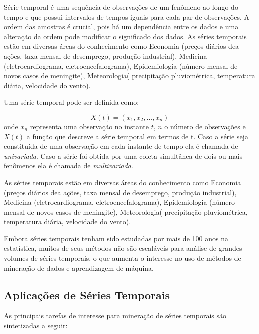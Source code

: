 Série temporal é uma sequência de observações de um fenômeno ao longo do tempo e que possui intervalos de tempos iguais para cada par de observações.  A ordem das amostras é crucial, pois há um dependência entre os dados e uma alteração da ordem pode modificar o significado dos dados. As séries temporais estão em diversas áreas do conhecimento como Economia (preços diários dea ações, taxa mensal de desemprego, produção industrial), Medicina (eletrocardiograma, eletroencefalograma), Epidemiologia (número mensal de novos casos de meningite), Meteorologia( precipitação pluviométrica, temperatura diária, velocidade do vento).  

Uma série temporal pode ser definida como:

\begin{equation} \label{eq_TS}
X(t) = (x_1,x_2,...,x_n)
\end{equation}
onde $x_n$ representa uma observação no instante $t$, $n$ o número de observações e $X(t)$ a função que descreve a série temporal em termos de t. Caso a série seja constituída de uma observação em cada instante de tempo ela é chamada de \textit{univariada}. Caso a série foi obtida por uma coleta simultânea de dois ou mais fenômenos ela é chamada de \textit{multivariada}.

As séries temporais estão em diversas áreas do conhecimento como Economia (preços diários dea ações, taxa mensal de desemprego, produção industrial), Medicina (eletrocardiograma, eletroencefalograma), Epidemiologia (número mensal de novos casos de meningite), Meteorologia( precipitação pluviométrica, temperatura diária, velocidade do vento).

Embora séries temporais tenham sido estudadas por mais de 100 anos na estatística, muitos de seus métodos não são escaláveis para análise de grandes volumes de séries temporais, o que aumenta o interesse no uso de métodos de mineração de dados e aprendizagem de máquina. \cite{Maimon:2005:DMK:1088958}
\subsection{Aplicações de Séries Temporais}
As principais tarefas de interesse para mineração de séries temporais são sintetizadas a seguir\cite{Maimon:2005:DMK:1088958}:

